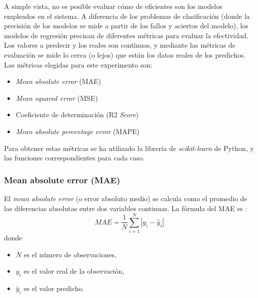 \documentclass[12pt,a4paper]{article}
\begin{document}
A simple vista, no es posible evaluar cómo de eficientes son los modelos empleados en el sistema. A diferencia de los problemas de clasificación (donde la precisión de los modelos se mide a partir de los fallos y aciertos del modelo), los modelos de regresión precisan de diferentes métricas para evaluar la efectividad. Los valores a predecir y los reales son continuos, y mediante las métricas de evaluación se mide lo cerca (o lejos) que están los datos reales de los predichos.
Las métricas elegidas para este experimento son:
\begin{itemize}
	\item \textit{Mean absolute error} (MAE)
	\item \textit{Mean squared error} (MSE)
	\item Coeficiente de determinación (R2 \textit{Score})
	\item \textit{Mean absolute percentage error} (MAPE)
\end{itemize}

Para obtener estas métricas se ha utilizado la librería de \textit{scikit-learn} de Python, y las funciones correspondientes para cada caso.

\subsubsection{Mean absolute error (MAE)}\label{mae}
El \textit{mean absolute error} (o error absoluto medio) se calcula como el promedio de las diferencias absolutas entre dos variables continuas. La fórmula del MAE es \cite{eswiki:146234007}:
\begin{equation}\label{eq:mae}
	MAE = \frac{1}{N} \sum_{i=1}^{N} |y_i - \hat{y}_i|
\end{equation}
donde
\begin{itemize}
	\item $N$ es el número de observaciones,
	\item $y_i$ es el valor real de la observación,
	\item $\hat{y}_i$ es el valor predicho.
\end{itemize}
\end{document}
